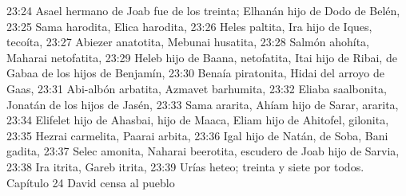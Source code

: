 23:24 Asael hermano de Joab fue de los treinta; Elhanán hijo de Dodo de Belén,  
23:25 Sama harodita, Elica harodita,  
23:26 Heles paltita, Ira hijo de Iques, tecoíta,  
23:27 Abiezer anatotita, Mebunai husatita,  
23:28 Salmón ahohíta, Maharai netofatita,  
23:29 Heleb hijo de Baana, netofatita, Itai hijo de Ribai, de Gabaa de los hijos de Benjamín,  
23:30 Benaía piratonita, Hidai del arroyo de Gaas,  
23:31 Abi-albón arbatita, Azmavet barhumita,  
23:32 Eliaba saalbonita, Jonatán de los hijos de Jasén,  
23:33 Sama ararita, Ahíam hijo de Sarar, ararita, 
23:34 Elifelet hijo de Ahasbai, hijo de Maaca, Eliam hijo de Ahitofel, gilonita,  
23:35 Hezrai carmelita, Paarai arbita,  
23:36 Igal hijo de Natán, de Soba, Bani gadita,  
23:37 Selec amonita, Naharai beerotita, escudero de Joab hijo de Sarvia,  
23:38 Ira itrita, Gareb itrita,  
23:39 Urías heteo; treinta y siete por todos.  
Capítulo 24
David censa al pueblo  
 

